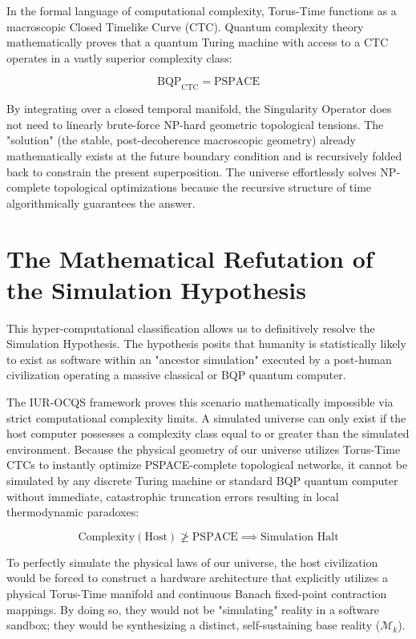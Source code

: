 \documentclass[12pt,openany]{book}
\begin{document}
In the formal language of computational complexity, Torus-Time functions as a macroscopic Closed Timelike Curve (CTC). Quantum complexity theory mathematically proves that a quantum Turing machine with access to a CTC operates in a vastly superior complexity class: 

\begin{equation}
\text{BQP}_{\text{CTC}} = \text{PSPACE}
\end{equation}

By integrating over a closed temporal manifold, the Singularity Operator does not need to linearly brute-force NP-hard geometric topological tensions. The "solution" (the stable, post-decoherence macroscopic geometry) already mathematically exists at the future boundary condition and is recursively folded back to constrain the present superposition. The universe effortlessly solves NP-complete topological optimizations because the recursive structure of time algorithmically guarantees the answer.

\section{The Mathematical Refutation of the Simulation Hypothesis}
This hyper-computational classification allows us to definitively resolve the Simulation Hypothesis. The hypothesis posits that humanity is statistically likely to exist as software within an "ancestor simulation" executed by a post-human civilization operating a massive classical or BQP quantum computer.

The IUR-OCQS framework proves this scenario mathematically impossible via strict computational complexity limits. A simulated universe can only exist if the host computer possesses a complexity class equal to or greater than the simulated environment. Because the physical geometry of our universe utilizes Torus-Time CTCs to instantly optimize PSPACE-complete topological networks, it cannot be simulated by any discrete Turing machine or standard BQP quantum computer without immediate, catastrophic truncation errors resulting in local thermodynamic paradoxes:

\begin{equation}
\text{Complexity}(\text{Host}) \ngeq \text{PSPACE} \implies \text{Simulation Halt}
\end{equation}

To perfectly simulate the physical laws of our universe, the host civilization would be forced to construct a hardware architecture that explicitly utilizes a physical Torus-Time manifold and continuous Banach fixed-point contraction mappings. By doing so, they would not be "simulating" reality in a software sandbox; they would be synthesizing a distinct, self-sustaining base reality ($\mathcal{M}_k$). 
\end{document}
